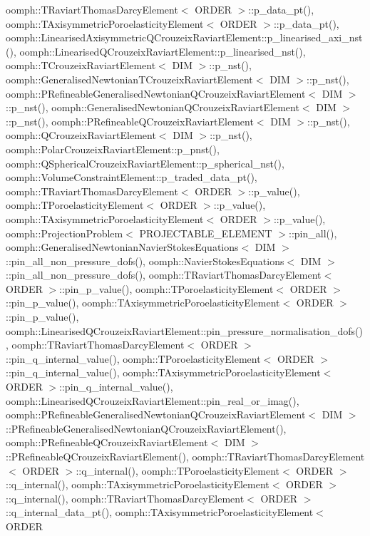 oomph\+::\+T\+Raviart\+Thomas\+Darcy\+Element$<$ O\+R\+D\+E\+R $>$\+::p\+\_\+data\+\_\+pt(), oomph\+::\+T\+Axisymmetric\+Poroelasticity\+Element$<$ O\+R\+D\+E\+R $>$\+::p\+\_\+data\+\_\+pt(), oomph\+::\+Linearised\+Axisymmetric\+Q\+Crouzeix\+Raviart\+Element\+::p\+\_\+linearised\+\_\+axi\+\_\+nst(), oomph\+::\+Linearised\+Q\+Crouzeix\+Raviart\+Element\+::p\+\_\+linearised\+\_\+nst(), oomph\+::\+T\+Crouzeix\+Raviart\+Element$<$ D\+I\+M $>$\+::p\+\_\+nst(), oomph\+::\+Generalised\+Newtonian\+T\+Crouzeix\+Raviart\+Element$<$ D\+I\+M $>$\+::p\+\_\+nst(), oomph\+::\+P\+Refineable\+Generalised\+Newtonian\+Q\+Crouzeix\+Raviart\+Element$<$ D\+I\+M $>$\+::p\+\_\+nst(), oomph\+::\+Generalised\+Newtonian\+Q\+Crouzeix\+Raviart\+Element$<$ D\+I\+M $>$\+::p\+\_\+nst(), oomph\+::\+P\+Refineable\+Q\+Crouzeix\+Raviart\+Element$<$ D\+I\+M $>$\+::p\+\_\+nst(), oomph\+::\+Q\+Crouzeix\+Raviart\+Element$<$ D\+I\+M $>$\+::p\+\_\+nst(), oomph\+::\+Polar\+Crouzeix\+Raviart\+Element\+::p\+\_\+pnst(), oomph\+::\+Q\+Spherical\+Crouzeix\+Raviart\+Element\+::p\+\_\+spherical\+\_\+nst(), oomph\+::\+Volume\+Constraint\+Element\+::p\+\_\+traded\+\_\+data\+\_\+pt(), oomph\+::\+T\+Raviart\+Thomas\+Darcy\+Element$<$ O\+R\+D\+E\+R $>$\+::p\+\_\+value(), oomph\+::\+T\+Poroelasticity\+Element$<$ O\+R\+D\+E\+R $>$\+::p\+\_\+value(), oomph\+::\+T\+Axisymmetric\+Poroelasticity\+Element$<$ O\+R\+D\+E\+R $>$\+::p\+\_\+value(), oomph\+::\+Projection\+Problem$<$ P\+R\+O\+J\+E\+C\+T\+A\+B\+L\+E\+\_\+\+E\+L\+E\+M\+E\+N\+T $>$\+::pin\+\_\+all(), oomph\+::\+Generalised\+Newtonian\+Navier\+Stokes\+Equations$<$ D\+I\+M $>$\+::pin\+\_\+all\+\_\+non\+\_\+pressure\+\_\+dofs(), oomph\+::\+Navier\+Stokes\+Equations$<$ D\+I\+M $>$\+::pin\+\_\+all\+\_\+non\+\_\+pressure\+\_\+dofs(), oomph\+::\+T\+Raviart\+Thomas\+Darcy\+Element$<$ O\+R\+D\+E\+R $>$\+::pin\+\_\+p\+\_\+value(), oomph\+::\+T\+Poroelasticity\+Element$<$ O\+R\+D\+E\+R $>$\+::pin\+\_\+p\+\_\+value(), oomph\+::\+T\+Axisymmetric\+Poroelasticity\+Element$<$ O\+R\+D\+E\+R $>$\+::pin\+\_\+p\+\_\+value(), oomph\+::\+Linearised\+Q\+Crouzeix\+Raviart\+Element\+::pin\+\_\+pressure\+\_\+normalisation\+\_\+dofs(), oomph\+::\+T\+Raviart\+Thomas\+Darcy\+Element$<$ O\+R\+D\+E\+R $>$\+::pin\+\_\+q\+\_\+internal\+\_\+value(), oomph\+::\+T\+Poroelasticity\+Element$<$ O\+R\+D\+E\+R $>$\+::pin\+\_\+q\+\_\+internal\+\_\+value(), oomph\+::\+T\+Axisymmetric\+Poroelasticity\+Element$<$ O\+R\+D\+E\+R $>$\+::pin\+\_\+q\+\_\+internal\+\_\+value(), oomph\+::\+Linearised\+Q\+Crouzeix\+Raviart\+Element\+::pin\+\_\+real\+\_\+or\+\_\+imag(), oomph\+::\+P\+Refineable\+Generalised\+Newtonian\+Q\+Crouzeix\+Raviart\+Element$<$ D\+I\+M $>$\+::\+P\+Refineable\+Generalised\+Newtonian\+Q\+Crouzeix\+Raviart\+Element(), oomph\+::\+P\+Refineable\+Q\+Crouzeix\+Raviart\+Element$<$ D\+I\+M $>$\+::\+P\+Refineable\+Q\+Crouzeix\+Raviart\+Element(), oomph\+::\+T\+Raviart\+Thomas\+Darcy\+Element$<$ O\+R\+D\+E\+R $>$\+::q\+\_\+internal(), oomph\+::\+T\+Poroelasticity\+Element$<$ O\+R\+D\+E\+R $>$\+::q\+\_\+internal(), oomph\+::\+T\+Axisymmetric\+Poroelasticity\+Element$<$ O\+R\+D\+E\+R $>$\+::q\+\_\+internal(), oomph\+::\+T\+Raviart\+Thomas\+Darcy\+Element$<$ O\+R\+D\+E\+R $>$\+::q\+\_\+internal\+\_\+data\+\_\+pt(), oomph\+::\+T\+Axisymmetric\+Poroelasticity\+Element$<$ O\+R\+D\+E\+R 